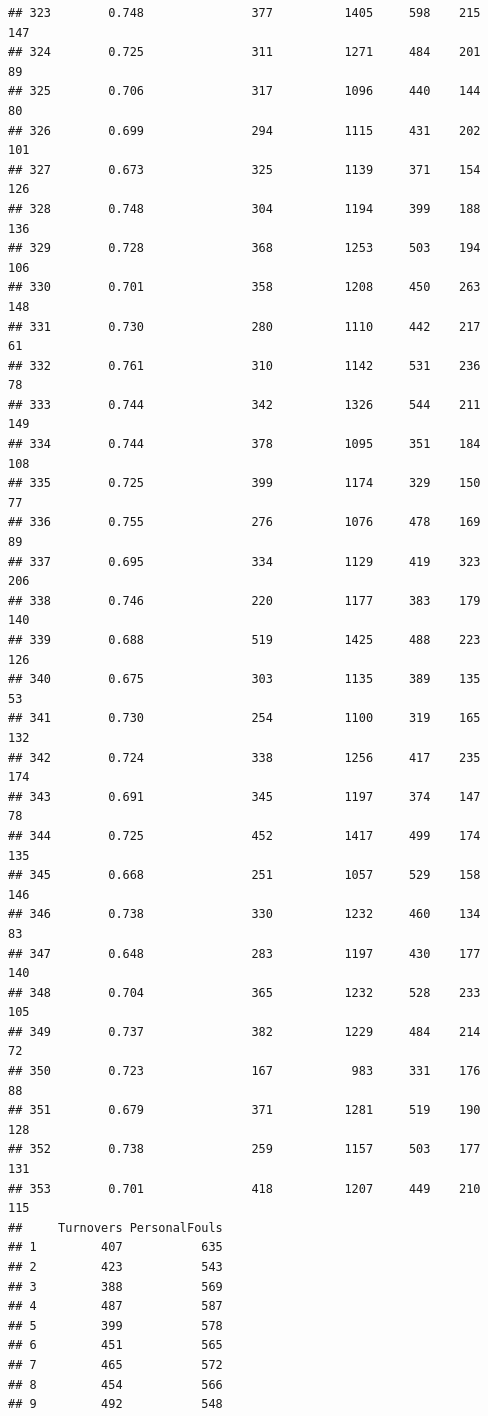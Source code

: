\documentclass[]{book}
\begin{document}
\begin{verbatim}
## 323        0.748               377          1405     598    215    147
## 324        0.725               311          1271     484    201     89
## 325        0.706               317          1096     440    144     80
## 326        0.699               294          1115     431    202    101
## 327        0.673               325          1139     371    154    126
## 328        0.748               304          1194     399    188    136
## 329        0.728               368          1253     503    194    106
## 330        0.701               358          1208     450    263    148
## 331        0.730               280          1110     442    217     61
## 332        0.761               310          1142     531    236     78
## 333        0.744               342          1326     544    211    149
## 334        0.744               378          1095     351    184    108
## 335        0.725               399          1174     329    150     77
## 336        0.755               276          1076     478    169     89
## 337        0.695               334          1129     419    323    206
## 338        0.746               220          1177     383    179    140
## 339        0.688               519          1425     488    223    126
## 340        0.675               303          1135     389    135     53
## 341        0.730               254          1100     319    165    132
## 342        0.724               338          1256     417    235    174
## 343        0.691               345          1197     374    147     78
## 344        0.725               452          1417     499    174    135
## 345        0.668               251          1057     529    158    146
## 346        0.738               330          1232     460    134     83
## 347        0.648               283          1197     430    177    140
## 348        0.704               365          1232     528    233    105
## 349        0.737               382          1229     484    214     72
## 350        0.723               167           983     331    176     88
## 351        0.679               371          1281     519    190    128
## 352        0.738               259          1157     503    177    131
## 353        0.701               418          1207     449    210    115
##     Turnovers PersonalFouls
## 1         407           635
## 2         423           543
## 3         388           569
## 4         487           587
## 5         399           578
## 6         451           565
## 7         465           572
## 8         454           566
## 9         492           548

\end{verbatim}
\end{document}

